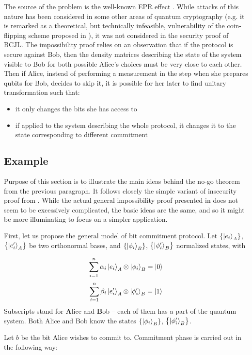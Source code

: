 \documentclass[10pt]{article}
\begin{document}
The source of the problem is the well-known EPR effect \cite{EPR}. While  attacks of this nature has
been considered in some other areas of quantum cryptography (e.g. it is remarked as a theoretical,
but technically infeasible, vulnerability of the coin-flipping scheme proposed in \cite{bb84}),
it was not considered in the security proof of BCJL. The impossibility proof relies on an observation
that if the protocol is secure against Bob, then the density matrices describing the state of the
system visible to Bob for both possible Alice's choices must be very close to each other. Then if 
Alice, instead of performing a measurement in the step when she prepares qubits for Bob, decides to
skip it, it is possible for her later to find unitary transformation such that:
\begin{itemize}
  \item it only changes the bits she has access to
  \item if applied to the system describing the whole protocol, it changes it to the state 
    corresponding to different commitment
\end{itemize}

\subsection*{Example}

Purpose of this section is to illustrate the main ideas behind the no-go theorem from the previous
paragraph. It follows closely the simple variant of insecurity proof from \cite{Lo96}. While the actual
general impossibility proof presented in \cite{Mayers97} does not seem to be excessively complicated,
the basic ideas are the same, and so it might be more illuminating to focus on a simpler application.

First, let us propose the general model of bit commitment protocol. Let \(\left\{\Ket{e_i}_A\right\}\),
\(\left\{\Ket{e'_i}_A\right\}\) be two orthonormal bases, and \(\left\{\Ket{\phi_i}_B\right\}\),
\(\left\{\Ket{\phi'_i}_B\right\}\) normalized states, with

\[
\sum_{i=1}^n\alpha_i \Ket{e_i}_A\otimes \Ket{\phi_i}_B=\Ket{0}
\]
\[
\sum_{i=1}^n\beta_i \Ket{e'_i}_A\otimes \Ket{\phi'_i}_B=\Ket{1}
\]
Subscripts stand for \textbf{A}lice and \textbf{B}ob -- each of them has a part of the quantum system. 
Both Alice and Bob know the states \(\left\{\Ket{\phi_i}_B\right\}\), \(\left\{\Ket{\phi'_i}_B\right\}\).

Let \(b\) be the bit Alice wishes to commit to. Commitment phase is carried out in the following
way:
\end{document}
